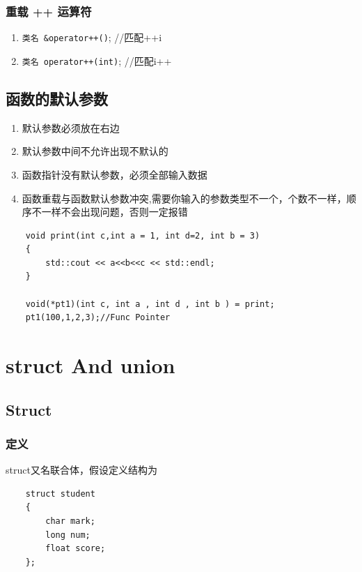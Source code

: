 \documentclass[UTF8,a4paper,12pt]{ctexbook} %
\begin{document}
	         \subsection{重载 ++ 运算符}
		          \begin{enumerate}[fullwidth,itemindent=2em]
		          	\item  	\verb|类名 &operator++()|;   //匹配++i
		          	\item  	\verb|类名 operator++(int)|; //匹配i++
		          \end{enumerate}
	 \section{函数的默认参数}
			 \begin{enumerate}[fullwidth,itemindent=2em]
			 	 \item   默认参数必须放在右边
			 	 \item   默认参数中间不允许出现不默认的
			 	 \item   函数指针没有默认参数，必须全部输入数据
			 	 \item   函数重载与函数默认参数冲突,需要你输入的参数类型不一个，个数不一样，顺序不一样不会出现问题，否则一定报错
			 \end{enumerate}
			 
			 \begin{lstlisting}
	void print(int c,int a = 1, int d=2, int b = 3)
	{
		std::cout << a<<b<<c << std::endl;
	}
	
	void(*pt1)(int c, int a , int d , int b ) = print;
	pt1(100,1,2,3);//Func Pointer			 	
			 \end{lstlisting}
        
\chapter{struct And union}
	\section{Struct} 
		\subsection{定义}
			struct又名联合体，假设定义结构为
			\begin{lstlisting}
	struct student
	{
		char mark;
		long num;
		float score;
	};			
			\end{lstlisting}
			
\end{document}
